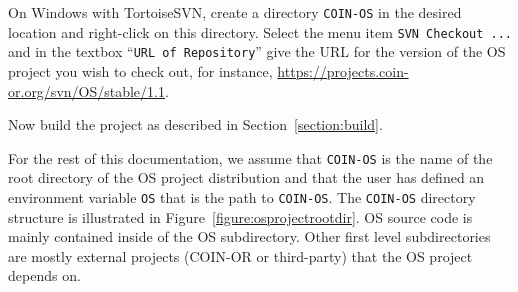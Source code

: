 \documentclass[11pt]{article}
\newcounter{Fig}
\renewcommand{\_}{{\char"5F}}
\renewcommand{\{}{{\char"7B}}
\renewcommand{\}}{{\char"7D}}
\renewcommand{\^}{{\char"0D}}
\renewcommand{\'}{{\char"0D}}
\begin{document}
\vskip 8pt

On Windows with TortoiseSVN, create a directory {\tt COIN-OS} in the desired location and right-click on this directory.   
Select the menu item {\tt SVN Checkout ...} and in the textbox ``{\tt URL of Repository}''
give the URL for the version of the OS project you wish to check out, for instance, \url{https://projects.coin-or.org/svn/OS/stable/1.1}.


Now build the project as described in  Section~\ref{section:build}.

For the rest of this documentation, we assume that  {\tt COIN-OS} is the name of the root directory 
of the OS project distribution and that the user has defined an environment variable {\tt OS} that is the path to 
{\tt COIN-OS}.  The {\tt COIN-OS} directory structure is illustrated in Figure~\ref{figure:osprojectrootdir}. 
OS source code is mainly contained inside of the OS subdirectory. Other first level subdirectories are mostly 
external projects (COIN-OR or third-party) that the OS project depends on.
\end{document}
